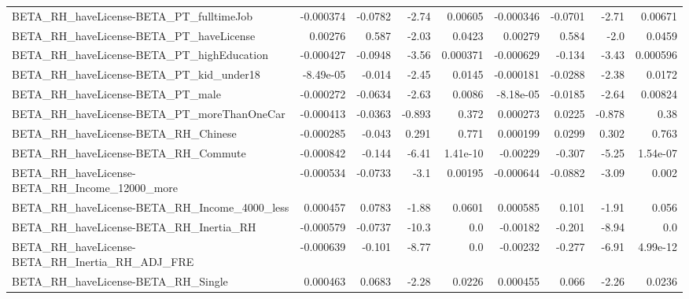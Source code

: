 \begin{tabular}{lrrrrrrrr}
BETA\_RH\_haveLicense-BETA\_PT\_fulltimeJob            &   -0.000374 &      -0.0782 &    -2.74 &  0.00605 &  -0.000346 &     -0.0701 &        -2.71 &       0.00671 \\
BETA\_RH\_haveLicense-BETA\_PT\_haveLicense            &     0.00276 &        0.587 &    -2.03 &   0.0423 &    0.00279 &       0.584 &         -2.0 &        0.0459 \\
BETA\_RH\_haveLicense-BETA\_PT\_highEducation          &   -0.000427 &      -0.0948 &    -3.56 & 0.000371 &  -0.000629 &      -0.134 &        -3.43 &      0.000596 \\
BETA\_RH\_haveLicense-BETA\_PT\_kid\_under18            &   -8.49e-05 &       -0.014 &    -2.45 &   0.0145 &  -0.000181 &     -0.0288 &        -2.38 &        0.0172 \\
BETA\_RH\_haveLicense-BETA\_PT\_male                   &   -0.000272 &      -0.0634 &    -2.63 &   0.0086 &  -8.18e-05 &     -0.0185 &        -2.64 &       0.00824 \\
BETA\_RH\_haveLicense-BETA\_PT\_moreThanOneCar         &   -0.000413 &      -0.0363 &   -0.893 &    0.372 &   0.000273 &      0.0225 &       -0.878 &          0.38 \\
BETA\_RH\_haveLicense-BETA\_RH\_Chinese                &   -0.000285 &       -0.043 &    0.291 &    0.771 &   0.000199 &      0.0299 &        0.302 &         0.763 \\
BETA\_RH\_haveLicense-BETA\_RH\_Commute                &   -0.000842 &       -0.144 &    -6.41 & 1.41e-10 &   -0.00229 &      -0.307 &        -5.25 &      1.54e-07 \\
BETA\_RH\_haveLicense-BETA\_RH\_Income\_12000\_more      &   -0.000534 &      -0.0733 &     -3.1 &  0.00195 &  -0.000644 &     -0.0882 &        -3.09 &         0.002 \\
BETA\_RH\_haveLicense-BETA\_RH\_Income\_4000\_less       &    0.000457 &       0.0783 &    -1.88 &   0.0601 &   0.000585 &       0.101 &        -1.91 &         0.056 \\
BETA\_RH\_haveLicense-BETA\_RH\_Inertia\_RH             &   -0.000579 &      -0.0737 &    -10.3 &      0.0 &   -0.00182 &      -0.201 &        -8.94 &           0.0 \\
BETA\_RH\_haveLicense-BETA\_RH\_Inertia\_RH\_ADJ\_FRE     &   -0.000639 &       -0.101 &    -8.77 &      0.0 &   -0.00232 &      -0.277 &        -6.91 &      4.99e-12 \\
BETA\_RH\_haveLicense-BETA\_RH\_Single                 &    0.000463 &       0.0683 &    -2.28 &   0.0226 &   0.000455 &       0.066 &        -2.26 &        0.0236 \\

\end{tabular}

